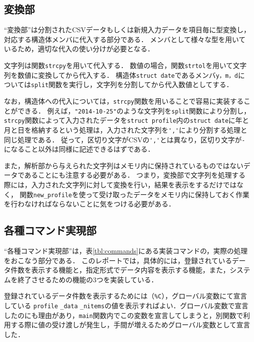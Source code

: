 \documentclass[a4j,11pt]{jarticle}
\begin{document}
\subsection{変換部} \label{sec:exchange}

``変換部''は分割されたCSVデータもしくは新規入力データを項目毎に型変換し，
対応する構造体メンバに代入する部分である．
メンバとして様々な型を用いているため，適切な代入の使い分けが必要となる．

文字列は関数\verb|strcpy|を用いて代入する．
数値の場合，関数\verb|strtol|を用いて文字列を数値に変換してから代入する．
構造体\verb|struct date|であるメンバ\verb|y，m，d|については\verb|split|関数を実行し，文字列を分割してから代入数値としてする．

なお，構造体への代入については，\verb|strcpy|関数を用いることで容易に実装することができる．
例えば，\verb|"2014-10-25"|のような文字列を\verb|split|関数により分割し，
\verb|strcpy|関数によって入力されたデータを\verb|struct profile|内の\verb|struct date|に年と月と日を格納するという処理は，入力された文字列を\verb|','|により分割する処理と同じ処理である．
従って，区切り文字がCSVの\verb|','|とは異なり，区切り文字が\verb|-|になること以外は同様に記述できるはずである．

また，解析部から与えられた文字列はメモリ内に保持されているものではないデータであることにも注意する必要がある．
つまり，変換部で文字列を処理する際には，入力された文字列に対して変換を行い，結果を表示をするだけではなく，
関数\verb|new_profile|を使って受け取ったデータをメモリ内に保持しておく作業を行わなければならないことに気をつける必要がある．

\subsection{各種コマンド実現部} \label{sec:command}

``各種コマンド実現部''は，表\ref{tbl:commands}にある実装コマンドの，実際の処理をおこなう部分である．
このレポートでは，具体的には，登録されているデータ件数を表示する機能と，指定形式でデータ内容を表示する機能，また，システムを終了させるための機能の3つを実装している．

登録されているデータ件数を表示するためには（\verb|%C|），グローバル変数にて宣言している
\verb|profile| \verb|_data| \verb|_nitems|の値を表示すればよい．グローバル変数で宣言したのにも理由があり，\verb|main|関数内でこの変数を宣言してしまうと，別関数で利用する際に値の受け渡しが発生し，手間が増えるためグローバル変数として宣言した．
\end{document}
